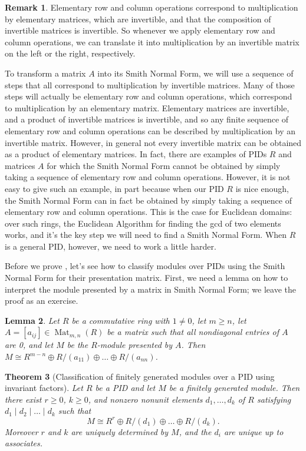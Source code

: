 \documentclass[12pt]{report}
\newtheorem{theorem}{Theorem}[chapter]
\newtheorem{lemma}[theorem]{Lemma}
\numberwithin{equation}{section}
\numberwithin{theorem}{chapter}
\theoremstyle{definition}
\newtheorem*{basic properties}{Basic Properties}
\newtheorem*{Important Remark}{Important Remark}
\newtheorem{remark}[theorem]{Remark}
\DeclareMathOperator{\M}{Mat}
\begin{document}
\begin{remark}
Elementary row and column operations correspond to multiplication by elementary matrices, which are invertible, and that the composition of invertible matrices is invertible. So whenever we apply elementary row and column operations, we can translate it into multiplication by an invertible matrix on the left or the right, respectively. 

To transform a matrix $A$ into its Smith Normal Form, we will use a sequence of steps that all correspond to multiplication by invertible matrices. Many of those steps will actually be elementary row and column operations, which correspond to multiplication by an elementary matrix. Elementary matrices are invertible, and a product of invertible matrices is invertible, and so any finite sequence of elementary row and column operations can be described by multiplication by an invertible matrix. However, in general not every invertible matrix can be obtained as a product of elementary matrices. In fact, there are examples of PIDs $R$ and matrices $A$ for which the Smith Normal Form cannot be obtained by simply taking a sequence of elementary row and column operations. However, it is not easy to give such an example, in part because when our PID $R$ is nice enough, the Smith Normal Form can in fact be obtained by simply taking a sequence of elementary row and column operations. This is the case for Euclidean domains: over such rings, the Euclidean Algorithm for finding the gcd of two elements works, and it's the key step we will need to find a Smith Normal Form. When $R$ is a general PID, however, we need to work a little harder.
\end{remark}

Before we prove , let's see how to classify modules over PIDs using the Smith Normal Form for their presentation matrix. First, we need a lemma on how to interpret the module presented by a matrix in Smith Normal Form; we leave the proof as an exercise.
 
\begin{lemma}\label{module given by SNF}
Let $R$ be a commutative ring with $1 \neq 0$, let $m \geqslant n$, let $A = [a_{ij}] \in \M_{m,n}(R)$ be a matrix such that all nondiagonal entries of $A$ are 0, and let $M$ be the $R$-module presented by $A$. Then $M \cong R^{m-n} \oplus R/(a_{11}) \oplus \dots \oplus R/(a_{nn})$.
\end{lemma}




\begin{theorem}[Classification of finitely generated modules over a PID using invariant factors]\label{classification mods over pids}
Let $R$ be a PID and let $M$ be a finitely generated module. Then there exist $r \geqslant 0$, $k \geqslant 0$, and nonzero nonunit elements $d_1,\ldots, d_k$ of $R$ satisfying $d_1 \mid  d_2 \mid \dots \mid d_k$ such that $$M \cong R^r \oplus R/(d_1) \oplus \dots \oplus R/(d_k).$$ Moreover $r$ and $k$ are uniquely determined by $M$, and the $d_i$ are unique up to associates.
\end{theorem}
\end{document}
